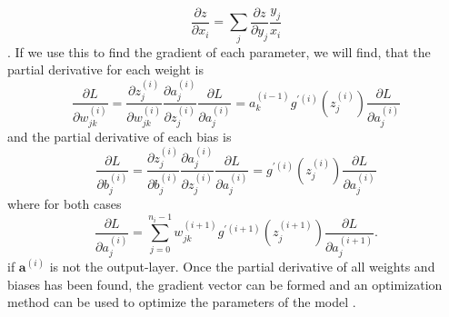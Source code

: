 \documentclass[./main.tex]{subfiles}
\begin{document}
$$\frac{\partial z}{\partial x_i} = \sum_j \frac{\partial z}{\partial y_j} \frac{y_j}{x_i}$$
\cite{DeepLearning}. If we use this to find the gradient of each parameter, we will find, that the partial derivative for each weight is
$$\frac{\partial L}{\partial w_{jk} ^{(i)}} = \frac{\partial z_j ^{(i)}}{\partial w_{jk} ^{(i)}} \frac{\partial a_j ^{(i)}}{\partial z_j ^{(i)}} \frac{\partial L}{\partial a_j ^{(i)}} = a_k ^{(i - 1)} g ^{\prime (i)} \left( z_j ^{(i)} \right) \frac{\partial L}{\partial a_j ^{(i)}}$$
and the partial derivative of each bias is
$$\frac{\partial L}{\partial b^{(i)} _j} = \frac{\partial z^{(i)} _j}{\partial b^{(i)} _j} \frac{\partial a_j ^{(i)}}{\partial z^{(i)} _j} \frac{\partial L}{\partial a_j ^{(i)}} = g^{\prime (i)} \left( z_j ^{(i)} \right) \frac{\partial L}{\partial a_j ^{(i)}}$$
where for both cases
$$ \frac{\partial L}{\partial a_j ^{(i)}} = \sum_{j = 0} ^{n_i - 1} w_{jk} ^{(i + 1)} g^{\prime (i + 1)} \left( z_j ^{(i + 1)} \right) \frac{\partial L}{\partial a_j ^{(i + 1)}}.$$
if $\bm{a}^{(i)}$ is not the output-layer. Once the partial derivative of all weights and biases has been found, the gradient vector can be formed and an optimization method can be used to optimize the parameters of the model \cite{3b1b_4}.
\end{document}
